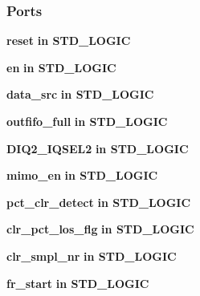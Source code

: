 \subsubsection*{Ports}
 \begin{DoxyCompactItemize}
\item 
{\bf reset}  {\bfseries {\bfseries \textcolor{keywordflow}{in}\textcolor{vhdlchar}{ }}} {\bfseries \textcolor{comment}{S\+T\+D\+\_\+\+L\+O\+G\+IC}\textcolor{vhdlchar}{ }} 
\item 
{\bf en}  {\bfseries {\bfseries \textcolor{keywordflow}{in}\textcolor{vhdlchar}{ }}} {\bfseries \textcolor{comment}{S\+T\+D\+\_\+\+L\+O\+G\+IC}\textcolor{vhdlchar}{ }} 
\item 
{\bf data\+\_\+src}  {\bfseries {\bfseries \textcolor{keywordflow}{in}\textcolor{vhdlchar}{ }}} {\bfseries \textcolor{comment}{S\+T\+D\+\_\+\+L\+O\+G\+IC}\textcolor{vhdlchar}{ }} 
\item 
{\bf outfifo\+\_\+full}  {\bfseries {\bfseries \textcolor{keywordflow}{in}\textcolor{vhdlchar}{ }}} {\bfseries \textcolor{comment}{S\+T\+D\+\_\+\+L\+O\+G\+IC}\textcolor{vhdlchar}{ }} 
\item 
{\bf D\+I\+Q2\+\_\+\+I\+Q\+S\+E\+L2}  {\bfseries {\bfseries \textcolor{keywordflow}{in}\textcolor{vhdlchar}{ }}} {\bfseries \textcolor{comment}{S\+T\+D\+\_\+\+L\+O\+G\+IC}\textcolor{vhdlchar}{ }} 
\item 
{\bf mimo\+\_\+en}  {\bfseries {\bfseries \textcolor{keywordflow}{in}\textcolor{vhdlchar}{ }}} {\bfseries \textcolor{comment}{S\+T\+D\+\_\+\+L\+O\+G\+IC}\textcolor{vhdlchar}{ }} 
\item 
{\bf pct\+\_\+clr\+\_\+detect}  {\bfseries {\bfseries \textcolor{keywordflow}{in}\textcolor{vhdlchar}{ }}} {\bfseries \textcolor{comment}{S\+T\+D\+\_\+\+L\+O\+G\+IC}\textcolor{vhdlchar}{ }} 
\item 
{\bf clr\+\_\+pct\+\_\+los\+\_\+flg}  {\bfseries {\bfseries \textcolor{keywordflow}{in}\textcolor{vhdlchar}{ }}} {\bfseries \textcolor{comment}{S\+T\+D\+\_\+\+L\+O\+G\+IC}\textcolor{vhdlchar}{ }} 
\item 
{\bf clr\+\_\+smpl\+\_\+nr}  {\bfseries {\bfseries \textcolor{keywordflow}{in}\textcolor{vhdlchar}{ }}} {\bfseries \textcolor{comment}{S\+T\+D\+\_\+\+L\+O\+G\+IC}\textcolor{vhdlchar}{ }} 
\item 
{\bf fr\+\_\+start}  {\bfseries {\bfseries \textcolor{keywordflow}{in}\textcolor{vhdlchar}{ }}} {\bfseries \textcolor{comment}{S\+T\+D\+\_\+\+L\+O\+G\+IC}\textcolor{vhdlchar}{ }} 
\item 

\end{DoxyCompactItemize}
